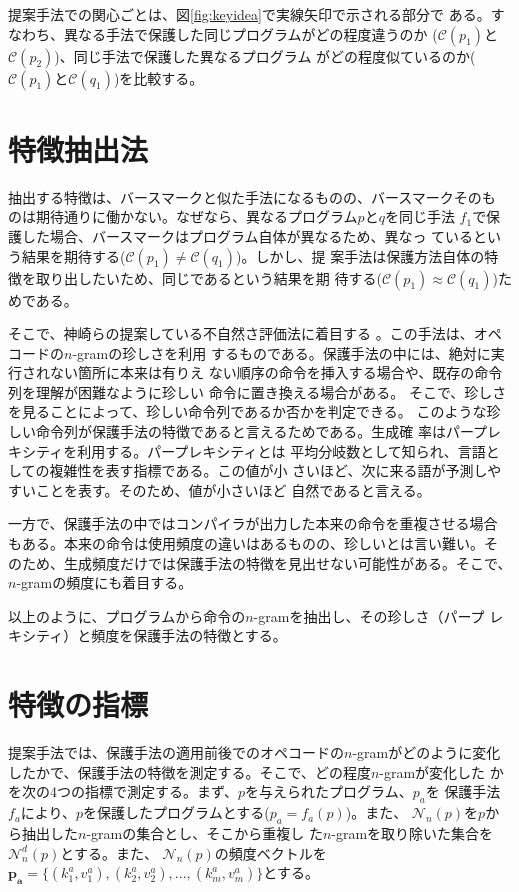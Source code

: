 \documentclass[12pt,twoside]{jbook}
\newcommand{\birth}[1]{\mathcal{C}(#1)}
\newcommand{\distinct}[1]{\mathcal{N}_n^d(#1)}
\begin{document}
提案手法での関心ごとは、図\ref{fig:keyidea}で実線矢印で示される部分で
ある。すなわち、異なる手法で保護した同じプログラムがどの程度違うのか
($\birth{p_1}$と$\birth{p_2}$)、同じ手法で保護した異なるプログラム
がどの程度似ているのか($\birth{p_1}$と$\birth{q_1}$)を比較する。

\section{特徴抽出法}\label{sect:artificiality}

抽出する特徴は、バースマークと似た手法になるものの、バースマークそのも
のは期待通りに働かない。なぜなら、異なるプログラム$p$と$q$を同じ手法
$f_1$で保護した場合、バースマークはプログラム自体が異なるため、異なっ
ているという結果を期待する($\birth{p_1} \neq \birth{q_1}$)。しかし、提
案手法は保護方法自体の特徴を取り出したいため、同じであるという結果を期
待する($\birth{p_1} \approx \birth{q_1}$)ためである。

そこで、神崎らの提案している不自然さ評価法に着目する
\cite{kanzaki14ipsj}。この手法は、オペコードの$n$-gramの珍しさを利用
するものである。保護手法の中には、絶対に実行されない箇所に本来は有りえ
ない順序の命令を挿入する場合や、既存の命令列を理解が困難なように珍しい
命令に置き換える場合がある。
%
そこで、珍しさを見ることによって、珍しい命令列であるか否かを判定できる。
このような珍しい命令列が保護手法の特徴であると言えるためである。生成確
率はパープレキシティを利用する\cite{gekka14scis}。パープレキシティとは
平均分岐数として知られ、言語としての複雑性を表す指標である。この値が小
さいほど、次に来る語が予測しやすいことを表す。そのため、値が小さいほど
自然であると言える。

一方で、保護手法の中ではコンパイラが出力した本来の命令を重複させる場合
もある。本来の命令は使用頻度の違いはあるものの、珍しいとは言い難い。そ
のため、生成頻度だけでは保護手法の特徴を見出せない可能性がある。そこで、
$n$-gramの頻度にも着目する。

以上のように、プログラムから命令の$n$-gramを抽出し、その珍しさ（パープ
  レキシティ）と頻度を保護手法の特徴とする。

\section{特徴の指標}\label{sect:index}

提案手法では、保護手法の適用前後でのオペコードの$n$-gramがどのように変化
したかで、保護手法の特徴を測定する。そこで、どの程度$n$-gramが変化した
かを次の4つの指標で測定する。まず、$p$を与えられたプログラム、$p_a$を
保護手法$f_a$により、$p$を保護したプログラムとする($p_a=f_a(p)$)。また、
$\mathcal{N}_n(p)$を$p$から抽出した$n$-gramの集合とし、そこから重複し
た$n$-gramを取り除いた集合を$\distinct{p}$とする。また、
$\mathcal{N}_n(p)$の頻度ベクトルを$\bm{p_a}=\{ (k^a_1, v^a_1), (k^a_2,
v^a_2), ..., (k^a_m, v^a_m) \}$とする。
\end{document}
